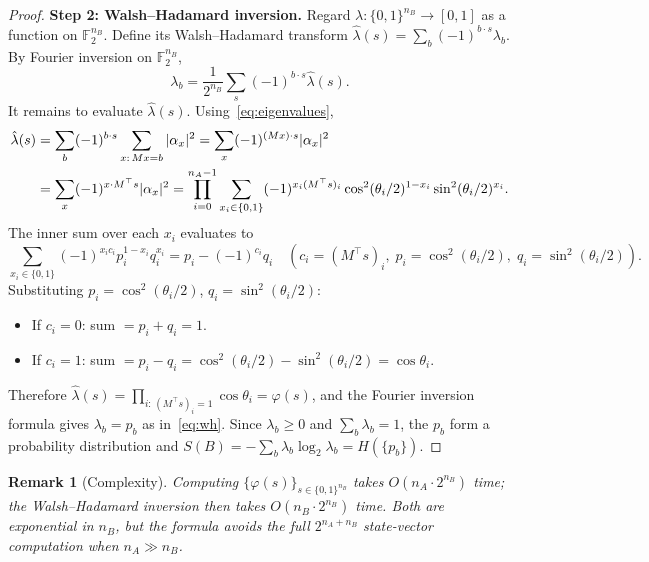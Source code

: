 \documentclass[11pt,a4paper]{article}
\newtheorem{remark}[theorem]{Remark}
\newcommand{\F}{\mathbb{F}}
\newcommand{\VNE}{S}
\begin{document}
\begin{proof}
\textbf{Step 2: Walsh–Hadamard inversion.}
Regard $\lambda : \{0,1\}^{n_B} \to [0,1]$ as a function on $\F_2^{n_B}$.
Define its Walsh–Hadamard transform
$\hat\lambda(s) = \sum_b (-1)^{b\cdot s}\lambda_b$.
By Fourier inversion on $\F_2^{n_B}$,
\begin{equation}
  \lambda_b = \frac{1}{2^{n_B}} \sum_{s} (-1)^{b\cdot s} \hat\lambda(s).
\end{equation}
It remains to evaluate $\hat\lambda(s)$.  Using~\eqref{eq:eigenvalues},
\begin{align}
  \hat\lambda(s)
  &= \sum_b (-1)^{b\cdot s} \sum_{x:\,Mx=b} |\alpha_x|^2
   = \sum_x (-1)^{(Mx)\cdot s} |\alpha_x|^2 \notag\\
  &= \sum_x (-1)^{x\cdot M^\top s} |\alpha_x|^2
   = \prod_{i=0}^{n_A-1}
     \sum_{x_i \in \{0,1\}} (-1)^{x_i (M^\top s)_i}
     \cos^2(\theta_i/2)^{1-x_i} \sin^2(\theta_i/2)^{x_i}.
   \label{eq:hat_lambda}
\end{align}
The inner sum over each $x_i$ evaluates to
\begin{equation}
  \sum_{x_i \in \{0,1\}} (-1)^{x_i c_i} p_i^{1-x_i} q_i^{x_i}
  = p_i - (-1)^{c_i} q_i
  \quad (c_i = (M^\top s)_i,\; p_i = \cos^2(\theta_i/2),\; q_i = \sin^2(\theta_i/2)).
\end{equation}
Substituting $p_i = \cos^2(\theta_i/2)$, $q_i = \sin^2(\theta_i/2)$:
\begin{itemize}
  \item If $c_i = 0$: sum $= p_i + q_i = 1$.
  \item If $c_i = 1$: sum $= p_i - q_i = \cos^2(\theta_i/2) - \sin^2(\theta_i/2) = \cos\theta_i$.
\end{itemize}
Therefore $\hat\lambda(s) = \prod_{i:\,(M^\top s)_i=1} \cos\theta_i = \varphi(s)$,
and the Fourier inversion formula gives $\lambda_b = p_b$ as
in~\eqref{eq:wh}.  Since $\lambda_b \geq 0$ and $\sum_b \lambda_b = 1$,
the $p_b$ form a probability distribution and
$\VNE(B) = -\sum_b \lambda_b \log_2 \lambda_b = H(\{p_b\})$.
\end{proof}

\begin{remark}[Complexity]
Computing $\{\varphi(s)\}_{s \in \{0,1\}^{n_B}}$ takes $O(n_A \cdot 2^{n_B})$ time;
the Walsh–Hadamard inversion then takes $O(n_B \cdot 2^{n_B})$ time.
Both are exponential in $n_B$, but the formula avoids the full $2^{n_A+n_B}$
state-vector computation when $n_A \gg n_B$.
\end{remark}

\end{document}
